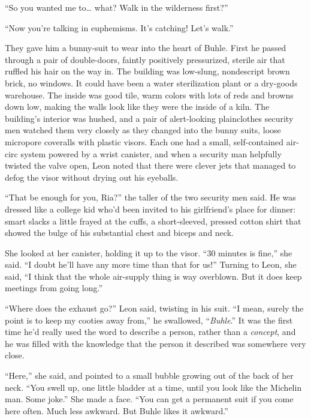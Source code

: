 “So you wanted me to\ldots{} what? Walk in the wilderness first?”

“Now you're talking in euphemisms. It's catching! Let's walk.”

\tb

They gave him a bunny-suit to wear into the heart of Buhle. First he 
passed through a pair of double-doors, faintly positively pressurized, 
sterile air that ruffled his hair on the way in. The building was 
low-slung, nondescript brown brick, no windows. It could have been a 
water sterilization plant or a dry-goods warehouse. The inside was good 
tile, warm colors with lots of reds and browns down low, making the 
walls look like they were the inside of a kiln. The building's interior 
was hushed, and a pair of alert-looking plainclothes security men 
watched them very closely as they changed into the bunny suits, loose 
micropore coveralls with plastic visors. Each one had a small, 
self-contained air-circ system powered by a wrist canister, and when a 
security man helpfully twisted the valve open, Leon noted that there 
were clever jets that managed to defog the visor without drying out his 
eyeballs.

“That be enough for you, Ria?” the taller of the two security men 
said. He was dressed like a college kid who'd been invited to his 
girlfriend's place for dinner: smart slacks a little frayed at the 
cuffs, a short-sleeved, pressed cotton shirt that showed the bulge of 
his substantial chest and biceps and neck.

She looked at her canister, holding it up to the visor. “30 minutes 
is fine,” she said. “I doubt he'll have any more time than that for 
us!” Turning to Leon, she said, “I think that the whole air-supply 
thing is way overblown. But it does keep meetings from going long.”

“Where does the exhaust go?” Leon said, twisting in his suit. “I 
mean, surely the point is to keep my cooties away from,” he 
swallowed, “\emph{Buhle}.” It was the first time he'd really used 
the word to describe a person, rather than a \emph{concept}, and he was 
filled with the knowledge that the person it described was somewhere 
very close.

“Here,” she said, and pointed to a small bubble growing out of the 
back of her neck. “You swell up, one little bladder at a time, until 
you look like the Michelin man. Some joke.” She made a face. “You 
can get a permanent suit if you come here often. Much less awkward. But 
Buhle likes it awkward.”

